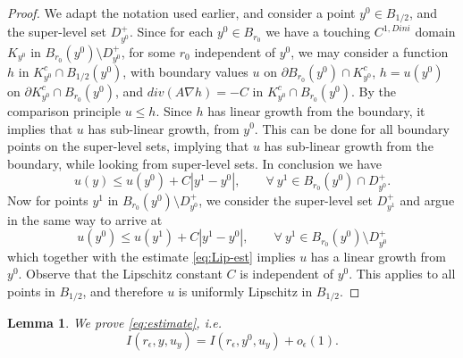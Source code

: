 \documentclass[11pt,reqno]{amsart}
\theoremstyle{plain}
\newtheorem{lem}[thm]{Lemma}
\theoremstyle{remark}
\numberwithin{equation}{section}
\begin{document}
\begin{proof} We adapt the notation used earlier, and consider a point $y^0 \in B_{1/2}$, and the super-level set $D^+_{y^0}$.
     Since for each $y^0 \in B_{r_0}$ we have a touching $C^{1, Dini}$ domain $K_{y^0}$ in $B_{r_0}(y^0)\setminus D^+_{y^0}$, for some $r_0$ independent of $y^0$, 
     we may consider a  function $h$ in $K_{y^0}^c \cap B_{1/2} (y^0)$, with boundary values $u$ on $\partial B_{r_0} (y^0) \cap K^c_{y^0}$,  $h= u(y^0)$ on $\partial K^c_{y^0} \cap  B_{r_0} (y^0)$, and $div(A \nabla h) = -C$ in $K_{y^0}^c \cap B_{r_0} (y^0)$.
By the comparison principle $u \leq h$. Since $h$ has linear growth from the boundary, it implies that $u$ has sub-linear growth, from $y^0$. This can be done for all boundary points on the super-level sets, implying that $u$ has sub-linear growth from the boundary, while looking from super-level sets. In conclusion we have
\begin{equation}\label{eq:Lip-est}
    u(y) \leq u(y^0) + C|y^1-y^0|, \qquad \forall \ y^1 \in   B_{r_0}(y^0) \cap D^+_{y^0}.
\end{equation}
Now for points $y^1$ in $B_{r_0}(y^0) \setminus  D^+_{y^0}$, we consider the super-level set 
$D^+_{y^1}$ and argue in the same way to arrive at 
$$
u(y^0) \leq u(y^1) + C|y^1-y^0|,  \qquad \forall \  y^1 \in B_{r_0}(y^0) \setminus  D^+_{y^0}
$$
which together with the estimate \eqref{eq:Lip-est} implies $u$  has a  linear growth from $y^0$. Observe that the Lipschitz constant $C$ is independent of $y^0$.
This applies to all points in $B_{1/2}$, and 
therefore $u$ is uniformly  Lipschitz in $B_{1/2}$.


\end{proof}


\begin{lem}\label{lem:estimates}
 We prove    \eqref{eq:estimate}, i.e.
 \begin{equation}
    I(r_\epsilon,y,u_y) =  I(r_\epsilon,y^0,u_y) + o_\epsilon (1).
\end{equation}
\end{lem}
\end{document}
